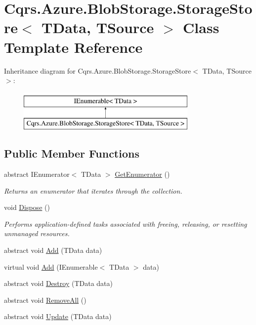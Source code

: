 \hypertarget{classCqrs_1_1Azure_1_1BlobStorage_1_1StorageStore}{}\section{Cqrs.\+Azure.\+Blob\+Storage.\+Storage\+Store$<$ T\+Data, T\+Source $>$ Class Template Reference}
\label{classCqrs_1_1Azure_1_1BlobStorage_1_1StorageStore}
Inheritance diagram for Cqrs.\+Azure.\+Blob\+Storage.\+Storage\+Store$<$ T\+Data, T\+Source $>$\+:\begin{figure}[H]
\begin{center}
\leavevmode
\includegraphics[height=2.000000cm]{classCqrs_1_1Azure_1_1BlobStorage_1_1StorageStore}
\end{center}
\end{figure}
\subsection*{Public Member Functions}
\begin{DoxyCompactItemize}
\item 
abstract I\+Enumerator$<$ T\+Data $>$ \hyperlink{classCqrs_1_1Azure_1_1BlobStorage_1_1StorageStore_a2eb689ea51d586309b79d6cbac05b616}{Get\+Enumerator} ()
\begin{DoxyCompactList}\small\item\em Returns an enumerator that iterates through the collection. \end{DoxyCompactList}\item 
void \hyperlink{classCqrs_1_1Azure_1_1BlobStorage_1_1StorageStore_a3fddffcffd2bd3c79212bb6ef2cdc422}{Dispose} ()
\begin{DoxyCompactList}\small\item\em Performs application-\/defined tasks associated with freeing, releasing, or resetting unmanaged resources. \end{DoxyCompactList}\item 
abstract void \hyperlink{classCqrs_1_1Azure_1_1BlobStorage_1_1StorageStore_af56bdbd7fa6650aaef5c0bab9ed55f1a}{Add} (T\+Data data)
\item 
virtual void \hyperlink{classCqrs_1_1Azure_1_1BlobStorage_1_1StorageStore_a989d749e5f9efc10b1a416feec02657d}{Add} (I\+Enumerable$<$ T\+Data $>$ data)
\item 
abstract void \hyperlink{classCqrs_1_1Azure_1_1BlobStorage_1_1StorageStore_a9879b4ab18c2a33d7e20bc0b3a734195}{Destroy} (T\+Data data)
\item 
abstract void \hyperlink{classCqrs_1_1Azure_1_1BlobStorage_1_1StorageStore_a4e848f342be903293812b3b660464d1a}{Remove\+All} ()
\item 
abstract void \hyperlink{classCqrs_1_1Azure_1_1BlobStorage_1_1StorageStore_ae9ca8bfe30040f77e349a4d47b31da70}{Update} (T\+Data data)
\end{DoxyCompactItemize}
